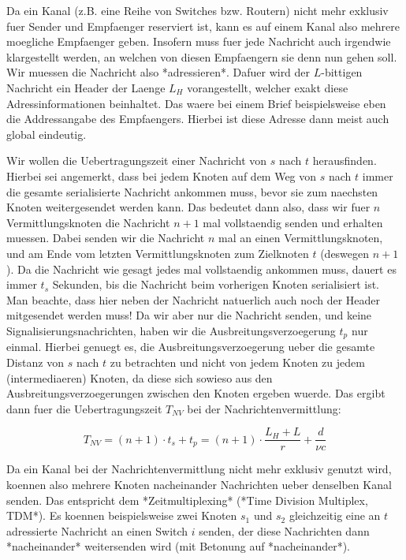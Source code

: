 Da ein Kanal (z.B. eine Reihe von Switches bzw. Routern) nicht mehr exklusiv
fuer Sender und Empfaenger reserviert ist, kann es auf einem Kanal also mehrere
moegliche Empfaenger geben. Insofern muss fuer jede Nachricht auch irgendwie
klargestellt werden, an welchen von diesen Empfaengern sie denn nun gehen
soll. Wir muessen die Nachricht also *adressieren*. Dafuer wird der $L$-bittigen
Nachricht ein Header der Laenge $L_H$ vorangestellt, welcher exakt diese
Adressinformationen beinhaltet. Das waere bei einem Brief beispielsweise eben
die Addressangabe des Empfaengers. Hierbei ist diese Adresse dann meist auch
global eindeutig.

Wir wollen die Uebertragungszeit einer Nachricht von $s$ nach $t$
herausfinden. Hierbei sei angemerkt, dass bei jedem Knoten auf dem Weg von $s$
nach $t$ immer die gesamte serialisierte Nachricht ankommen muss, bevor sie zum
naechsten Knoten weitergesendet werden kann. Das bedeutet dann also, dass wir
fuer $n$ Vermittlungsknoten die Nachricht $n + 1$ mal vollstaendig senden und
erhalten muessen. Dabei senden wir die Nachricht $n$ mal an einen
Vermittlungsknoten, und am Ende vom letzten Vermittlungsknoten zum Zielknoten
$t$ (deswegen $n + 1$). Da die Nachricht wie gesagt jedes mal vollstaendig
ankommen muss, dauert es immer $t_s$ Sekunden, bis die Nachricht beim vorherigen
Knoten serialisiert ist. Man beachte, dass hier neben der Nachricht natuerlich
auch noch der Header mitgesendet werden muss! Da wir aber nur die Nachricht
senden, und keine Signalisierungsnachrichten, haben wir die
Ausbreitungsverzoegerung $t_p$ nur einmal. Hierbei genuegt es, die
Ausbreitungsverzoegerung ueber die gesamte Distanz von $s$ nach $t$ zu
betrachten und nicht von jedem Knoten zu jedem (intermediaeren) Knoten, da diese
sich sowieso aus den Ausbreitungsverzoegerungen zwischen den Knoten ergeben
wuerde. Das ergibt dann fuer die Uebertragungszeit $T_{NV}$ bei der
Nachrichtenvermittlung:

$$T_{NV} = (n + 1) \cdot t_s + t_p = (n + 1) \cdot \frac{L_H + L}{r} +
\frac{d}{\nu c}$$

Da ein Kanal bei der Nachrichtenvermittlung nicht mehr exklusiv genutzt wird,
koennen also mehrere Knoten nacheinander Nachrichten ueber denselben Kanal
senden. Das entspricht dem *Zeitmultiplexing* (*Time Division Multiplex,
TDM*). Es koennen beispielsweise zwei Knoten $s_1$ und $s_2$ gleichzeitig eine
an $t$ adressierte Nachricht an einen Switch $i$ senden, der diese Nachrichten
dann *nacheinander* weitersenden wird (mit Betonung auf *nacheinander*).

